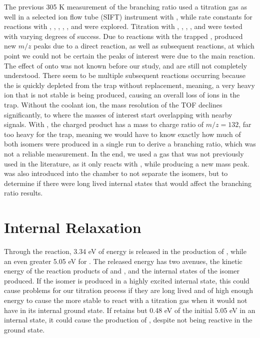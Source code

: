 The previous 305 K measurement of the branching ratio used a titration gas as well in a selected ion flow tube (SIFT) instrument with , while rate constants for reactions with , , , , , and  were explored.\cite{Love1987,Freeman1987} Titration with , , , , and  were tested with varying degrees of success. Due to reactions with the trapped ,  produced new $m/z$ peaks due to a direct reaction, as well as subsequent reactions, at which point we could not be certain the peaks of interest were due to the main reaction. The effect of  onto  was not known before our study, and are still not completely understood. There seem to be multiple subsequent reactions occurring because the  is quickly depleted from the trap without replacement, meaning, a very heavy ion that is not stable is being produced, causing an overall loss of ions in the trap. Without the coolant ion, the mass resolution of the TOF declines significantly, to where the masses of interest start overlapping with nearby signals. With , the charged product  has a mass to charge ratio of $m/z=132$, far too heavy for the trap, meaning we would have to know exactly how much of both isomers were produced in a single run to derive a branching ratio, which was not a reliable measurement. In the end, we used a gas that was not previously used in the literature,  as it only reacts with , while producing a new mass peak.  was also introduced into the chamber to not separate the isomers, but to determine if there were long lived internal states that would affect the branching ratio results.

\section{Internal Relaxation}

Through the  reaction, 3.34 eV of energy is released in the production of , while an even greater 5.05 eV for . The released energy has two avenues, the kinetic energy of the reaction products of \ce{[HCO]+} and , and the internal states of the isomer produced. If the isomer is produced in a highly excited internal state, this could cause problems for our titration process if they are long lived and of high enough energy to cause the more stable  to react with a titration gas  when it would not have in its internal ground state. If  retains but 0.48 eV of the initial 5.05 eV in an internal state, it could cause the production of , despite not being reactive in the ground state.

